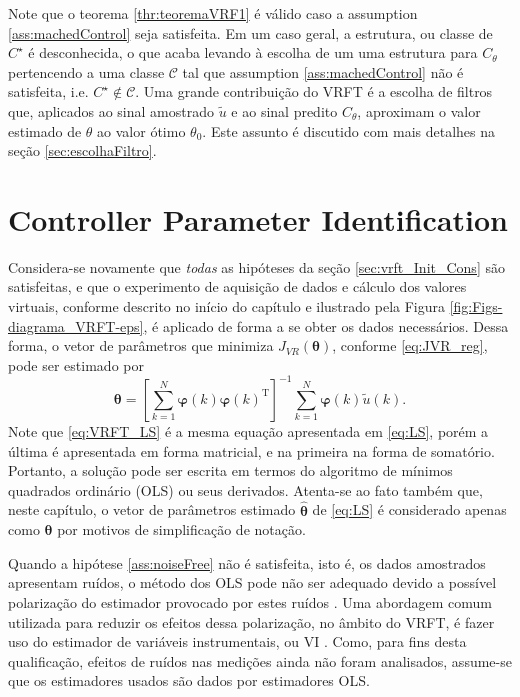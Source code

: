 Note que o teorema \ref{thr:teoremaVRF1} é válido caso a assumption \ref{ass:machedControl} seja satisfeita. Em um caso geral, a estrutura, ou classe de $C^\star$ é desconhecida, o que acaba levando à escolha de um uma estrutura para $C_\theta$ pertencendo a uma classe $\mathscr{C}$ tal que assumption \ref{ass:machedControl} não é satisfeita, i.e. $C^\star \notin \mathscr{C} $.
Uma grande contribuição do VRFT é a escolha de filtros que, aplicados ao sinal amostrado $\tilde{u}$ e ao sinal predito $C_\theta$, aproximam o valor estimado de $\theta$ ao valor ótimo $\theta_0$. Este assunto é discutido com mais detalhes na seção \ref{sec:escolhaFiltro}.

\section{Controller Parameter Identification}%
\label{sec:controller_parameter_identification}

Considera-se novamente que \textit{todas} as hipóteses da seção \ref{sec:vrft_Init_Cons} são satisfeitas, e que o experimento de aquisição de dados e cálculo dos valores virtuais, conforme descrito no início do capítulo e ilustrado pela Figura \ref{fig:Figs-diagrama_VRFT-eps}, é aplicado de forma a se obter os dados necessários. Dessa forma, o vetor de parâmetros que minimiza  $J_{VR}(\bm{\theta})$, conforme \eqref{eq:JVR_reg}, pode ser estimado por 
\begin{equation}
   \bm{\theta} = \left[\sum_{k=1}^{N} \bm{\varphi}(k) \bm{\varphi}(k)^{\mathrm{T}}\right]^{-1} \sum_{k=1}^{N} \bm{\varphi}(k) \tilde{u}(k).
\label{eq:VRFT_LS} 
\end{equation}
Note que \eqref{eq:VRFT_LS} é a mesma equação apresentada em \eqref{eq:LS}, porém a última é apresentada em forma matricial, e na primeira na forma de somatório.
Portanto, a solução pode ser escrita em termos do algoritmo de mínimos quadrados ordinário (OLS) ou seus derivados.
Atenta-se ao fato também que, neste capítulo, o vetor de parâmetros estimado $\hat{\bm{\theta}}$ de \eqref{eq:LS} é considerado apenas como $\bm{\theta}$ por motivos de simplificação de notação. 

Quando a hipótese \ref{ass:noiseFree} não é satisfeita, isto é, os dados amostrados apresentam ruídos, o método dos OLS pode não ser adequado devido a possível polarização do estimador provocado por estes ruídos \citep{aguirre2015}.
Uma abordagem comum utilizada para reduzir os efeitos dessa polarização, no âmbito do VRFT, é fazer uso do estimador de variáveis instrumentais, ou VI \citep{young1970}. Como, para fins desta qualificação, efeitos de ruídos nas medições ainda não foram analisados, assume-se que os estimadores usados são dados por estimadores OLS.

